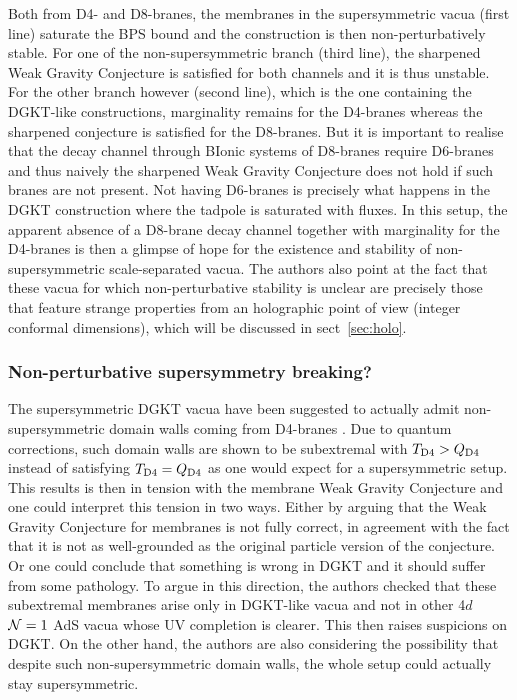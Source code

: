 \documentclass[11pt, a4paper]{article}
\newcommand{\N}{{\cal N}}
\begin{document}
Both from D4- and D8-branes, the membranes in the supersymmetric vacua (first line) saturate the BPS bound and the construction is then non-perturbatively stable. For one of the non-supersymmetric branch (third line), the sharpened Weak Gravity Conjecture is satisfied for both channels and it is thus unstable. For the other branch however (second line), which is the one containing the DGKT-like constructions, marginality remains for the D4-branes whereas the sharpened conjecture is satisfied for the D8-branes. But it is important to realise that the decay channel through BIonic systems of D8-branes require D6-branes and thus naively the sharpened Weak Gravity Conjecture does not hold if such branes are not present. Not having D6-branes is precisely what happens in the DGKT construction where the tadpole is saturated with fluxes. In this setup, the apparent absence of a D8-brane decay channel together with marginality for the D4-branes is then a glimpse of hope for the existence and stability of non-supersymmetric scale-separated vacua. The authors also point at the fact that these vacua for which non-perturbative stability is unclear are precisely those that feature strange properties from an holographic point of view (integer conformal dimensions), which will be discussed in sect~\ref{sec:holo}.

\subsubsection{Non-perturbative supersymmetry breaking?}
\label{sec:non-pert}

The supersymmetric DGKT vacua have been suggested to actually admit non-supersymmetric domain walls coming from D4-branes \cite{MiguelInProgress}. Due to quantum corrections, such domain walls are shown to be subextremal with $T_{\rm D4}>Q_{\rm D4}$ instead of satisfying $T_{\rm D4}=Q_{\rm D4}$ as one would expect for a supersymmetric setup. This results is then in tension with the membrane Weak Gravity Conjecture and one could interpret this tension in two ways. Either by arguing that the Weak Gravity Conjecture for membranes is not fully correct, in agreement with the fact that it is not as well-grounded as the original particle version of the conjecture. Or one could conclude that something is wrong in DGKT and it should suffer from some pathology. To argue in this direction, the authors checked that these subextremal membranes arise only in DGKT-like vacua and not in other 4$d$ $\N=1$ AdS vacua whose UV completion is clearer. This then raises suspicions on DGKT. On the other hand, the authors are also considering the possibility that despite such non-supersymmetric domain walls, the whole setup could actually stay supersymmetric.
\end{document}
